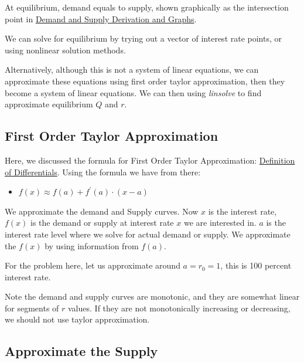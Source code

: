 \documentclass[
]{book}
\providecommand{\tightlist}{%
  \setlength{\itemsep}{0pt}\setlength{\parskip}{0pt}}
\begin{document}
At equilibrium, demand equals to supply, shown graphically as the
intersection point in \href{https://math4econ.github.io/derivative_application/K_borrow_firm.html}{Demand and Supply Derivation and
Graphs}.

We can solve for equilibrium by trying out a vector of interest rate
points, or using nonlinear solution methods.

Alternatively, although this is not a system of linear equations, we can
approximate these equations using first order taylor approximation, then
they become a system of linear equations. We can then using \emph{linsolve}
to find approximate equilibrium \(Q\) and \(r\).

\hypertarget{first-order-taylor-approximation}{%
\subsection{First Order Taylor Approximation}\label{first-order-taylor-approximation}}

Here, we discussed the formula for First Order Taylor Approximation:
\href{https://math4econ.github.io/derivative/derivative_MPL_first_order_taylor_approximation.html}{Definition of
Differentials}.
Using the formula we have from there:

\begin{itemize}
\tightlist
\item
  \(\displaystyle f(x)\approx f(a)+f^{\prime } (a)\cdot (x-a)\)
\end{itemize}

We approximate the demand and Supply curves. Now \(x\) is the interest
rate, \(f(x)\) is the demand or supply at interest rate \(x\) we are
interested in. \(a\) is the interest rate level where we solve for actual
demand or supply. We approximate the \(f(x)\) by using information from
\(f(a)\).

For the problem here, let us approximate around \(a=r_0 =1\), this is 100
percent interest rate.

Note the demand and supply curves are monotonic, and they are somewhat
linear for segments of \(r\) values. If they are not monotonically
increasing or decreasing, we should not use taylor approximation.

\hypertarget{approximate-the-supply}{%
\subsection{Approximate the Supply}\label{approximate-the-supply}}
\end{document}
